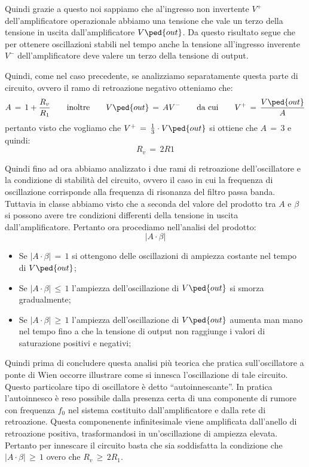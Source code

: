 Quindi grazie a questo noi sappiamo che al'ingresso non invertente $V^+$ dell'amplificatore operazionale abbiamo una tensione che vale un terzo della tensione in uscita dall'amplificatore $V\ped{out}$.
Da questo risultato segue che per ottenere oscillazioni stabili nel tempo anche la tensione all'ingresso inverente $V^-$ dell'amplificatore deve valere un terzo della tensione di output.

Quindi, come nel caso precedente, se analizziamo separatamente questa parte di circuito, ovvero il ramo di retroazione negativo otteniamo che:
\begin{equation}
	A\,=\,1 + \frac{R_v}{R_1} \qquad \text{inoltre} \qquad V\ped{out}\,=\,AV^- \qquad \text{da cui} \qquad V^+\,=\,\frac{V\ped{out}}{A}
\end{equation}
pertanto visto che vogliamo che $V^+\,=\,\frac{1}{3} \cdot V\ped{out}$ si ottiene che $A\,=\,3$ e quindi:
\begin{equation}
	R_v\,=\,2R1
\end{equation}

Quindi fino ad ora abbiamo analizzato i due rami di retroazione dell'oscillatore e la condizione di stabilità del circuito, ovvero il caso in cui la frequenza di oscillazione corrisponde alla frequenza di risonanza del filtro passa banda.
Tuttavia in classe abbiamo visto che a seconda del valore del prodotto tra $A$ e $\beta$ si possono avere tre condizioni differenti della tensione in uscita dall'amplificatore.
Pertanto ora procediamo nell'analisi del prodotto:
\begin{equation}
	\left|A \cdot \beta \right|
\end{equation}
\begin{itemize}
	\item{Se $\left|A \cdot \beta \right|\,=\,1$ si ottengono delle oscillazioni di ampiezza costante nel tempo di $V\ped{out}$;}
	\item{Se $\left|A \cdot \beta \right|\, \leq \,1$ l'ampiezza dell'oscillazione di $V\ped{out}$ si smorza gradualmente;}
	\item{Se $\left|A \cdot \beta \right|\, \geq \,1$ l'ampiezza dell'oscillazione di $V\ped{out}$ aumenta man mano nel tempo fino a che la tensione di output non raggiunge i valori di saturazione positivi e negativi;}
\end{itemize}

Quindi prima di concludere questa analisi più teorica che pratica sull'oscillatore a ponte di Wien occorre illustrare come si innesca l'oscillazione di tale circuito. Questo particolare tipo di oscillatore è detto ``autoinnescante''. In pratica l'autoinnesco è reso possibile dalla presenza certa di una componente di rumore con frequenza $f_0$ nel sistema costituito dall'amplificatore e dalla rete di retroazione. Questa componenente infinitesimale viene amplificata dall'anello di retroazione positiva, trasformandosi in un'oscillazione di ampiezza elevata. Pertanto per innescare il circuito basta che sia soddisfatta la condizione che $\left|A \cdot \beta \right|\, \geq \,1$ overo che $R_v\, \geq \,2R_1$.

